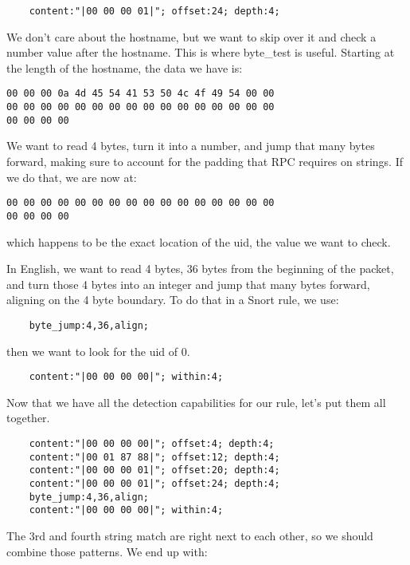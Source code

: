 \documentclass[english]{report}
\begin{document}
\begin{verbatim}
    content:"|00 00 00 01|"; offset:24; depth:4;
\end{verbatim}

We don't care about the hostname, but we want to skip over it and check a
number value after the hostname.  This is where byte\_test is useful.  Starting
at the length of the hostname, the data we have is:

\begin{verbatim}
00 00 00 0a 4d 45 54 41 53 50 4c 4f 49 54 00 00
00 00 00 00 00 00 00 00 00 00 00 00 00 00 00 00
00 00 00 00
\end{verbatim}

We want to read 4 bytes, turn it into a number, and jump that many bytes
forward, making sure to account for the padding that RPC requires on strings.
If we do that, we are now at:

\begin{verbatim}
00 00 00 00 00 00 00 00 00 00 00 00 00 00 00 00
00 00 00 00 
\end{verbatim}

which happens to be the exact location of the uid, the value we want to check.

In English, we want to read 4 bytes, 36 bytes from the beginning of the packet,
and turn those 4 bytes into an integer and jump that many bytes forward,
aligning on the 4 byte boundary.  To do that in a Snort rule, we use:

\begin{verbatim}
    byte_jump:4,36,align;
\end{verbatim}

then we want to look for the uid of 0.

\begin{verbatim}
    content:"|00 00 00 00|"; within:4;
\end{verbatim}

Now that we have all the detection capabilities for our rule, let's put them
all together.  

\begin{verbatim}
    content:"|00 00 00 00|"; offset:4; depth:4;
    content:"|00 01 87 88|"; offset:12; depth:4;
    content:"|00 00 00 01|"; offset:20; depth:4;
    content:"|00 00 00 01|"; offset:24; depth:4;
    byte_jump:4,36,align;
    content:"|00 00 00 00|"; within:4;
\end{verbatim}

The 3rd and fourth string match are right next to each other, so we should
combine those patterns.  We end up with:
\end{document}
